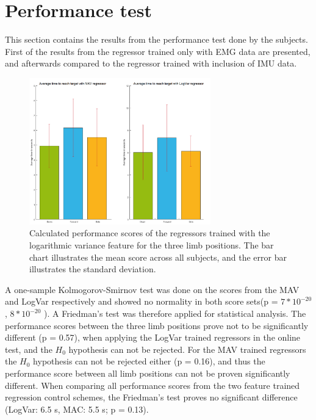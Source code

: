 \section{Performance test}
This section contains the results from the performance test done by the subjects. First of the results from the regressor trained only with EMG data are presented, and afterwards compared to the regressor trained with inclusion of IMU data. 

\begin{figure}[H]
	\includegraphics[width=0.7\textwidth]{figures/results/GotItTime}  %
	\caption{Calculated performance scores of the regressors trained with the logarithmic variance feature for the three limb positions. The bar chart illustrates the mean score across all subjects, and the error bar illustrates the standard deviation.}
	\label{fig:GotItTime}  %
\end{figure}

A one-sample Kolmogorov-Smirnov test was done on the scores from the MAV and LogVar respectively and showed no normality in both score sets(p = $7 * 10^{-20}$, $8 * 10^{-20}$ ). A Friedman's test was therefore applied for statistical analysis. The performance scores between the three limb positions prove not to be significantly different (p = 0.57), when applying the LogVar trained regressors in the online test, and the $H_0$ hypothesis can not be rejected. For the MAV trained regressors the $H_0$ hypothesis can not be rejected either (p = 0.16), and thus the performance score between all limb positions can not be proven significantly different. When comparing all performance scores from the two feature trained regression control schemes, the Friedman's test proves no significant difference (LogVar: 6.5 s, MAC: 5.5 s; p = 0.13).



